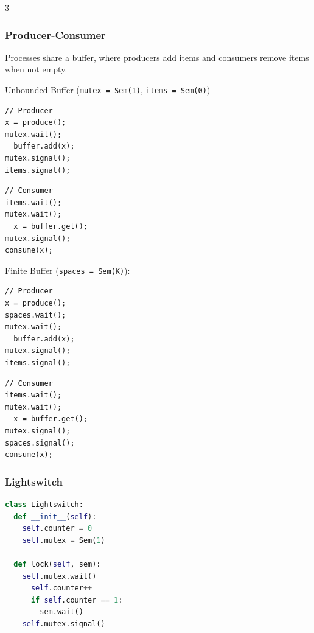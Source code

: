 \documentclass[12pt, a4paper]{article}
\begin{document}
\begin{multicols*}{3}
\subsubsection{Producer-Consumer}
Processes share a buffer, where producers add items and consumers remove items when not empty.

Unbounded Buffer (\lstinline|mutex = Sem(1)|, \lstinline|items = Sem(0)|)
\begin{minipage}{0.45\columnwidth}
  \begin{lstlisting}
// Producer
x = produce();
mutex.wait();
  buffer.add(x);
mutex.signal();
items.signal();
  \end{lstlisting}
\end{minipage}
\begin{minipage}{0.5\columnwidth}
  \begin{lstlisting}
// Consumer
items.wait();
mutex.wait();
  x = buffer.get();
mutex.signal();
consume(x);
  \end{lstlisting}
\end{minipage}

Finite Buffer (\lstinline|spaces = Sem(K)|):\\
\begin{minipage}{0.45\columnwidth}
  \begin{lstlisting}
// Producer
x = produce();
spaces.wait();
mutex.wait();
  buffer.add(x);
mutex.signal();
items.signal();
  \end{lstlisting}
\end{minipage}
\begin{minipage}{0.5\columnwidth}
  \begin{lstlisting}
// Consumer
items.wait();
mutex.wait();
  x = buffer.get();
mutex.signal();
spaces.signal();
consume(x);
  \end{lstlisting}
\end{minipage}

\begin{minipage}{0.45\columnwidth}
\subsubsection{Lightswitch}
  \begin{lstlisting}[language=Python,basicstyle=\ttfamily\tiny]
class Lightswitch:
  def __init__(self):
    self.counter = 0 
    self.mutex = Sem(1)

  def lock(self, sem):
    self.mutex.wait()
      self.counter++
      if self.counter == 1:
        sem.wait()
    self.mutex.signal()


\end{lstlisting}
\end{minipage}
\end{multicols*}
\end{document}
